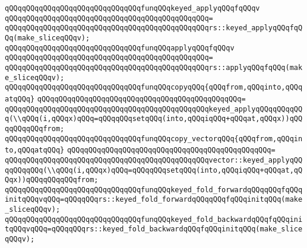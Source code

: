 \newline
\newline
\verb|qQQqqQQqqQQqqQQqqQQqqQQqqQQqqQQqfunqQQqkeyed_applyqQQqfqQQqv|\newline
\verb|qQQqqQQqqQQqqQQqqQQqqQQqqQQqqQQqqQQqqQQqqQQqqQQq=|\newline
\verb|qQQqqQQqqQQqqQQqqQQqqQQqqQQqqQQqqQQqqQQqqQQqqQQqrs::keyed_applyqQQqfqQQq(make_sliceqQQqv);|\newline
\newline
\newline
\verb|qQQqqQQqqQQqqQQqqQQqqQQqqQQqqQQqfunqQQqapplyqQQqfqQQqv|\newline
\verb|qQQqqQQqqQQqqQQqqQQqqQQqqQQqqQQqqQQqqQQqqQQqqQQq=|\newline
\verb|qQQqqQQqqQQqqQQqqQQqqQQqqQQqqQQqqQQqqQQqqQQqqQQqrs::applyqQQqfqQQq(make_sliceqQQqv);|\newline
\newline
\newline
\verb|qQQqqQQqqQQqqQQqqQQqqQQqqQQqqQQqfunqQQqcopyqQQq{qQQqfrom,qQQqinto,qQQqatqQQq}|\newline
\verb|qQQqqQQqqQQqqQQqqQQqqQQqqQQqqQQqqQQqqQQqqQQqqQQq=|\newline
\verb|qQQqqQQqqQQqqQQqqQQqqQQqqQQqqQQqqQQqqQQqqQQqqQQqkeyed_applyqQQqqQQqqQQq(\\qQQq(i,qQQqx)qQQq=qQQqqQQqsetqQQq(into,qQQqiqQQq+qQQqat,qQQqx))qQQqqQQqqQQqfrom;|\newline
\newline
\newline
\verb|qQQqqQQqqQQqqQQqqQQqqQQqqQQqqQQqfunqQQqcopy_vectorqQQq{qQQqfrom,qQQqinto,qQQqatqQQq}|\newline
\verb|qQQqqQQqqQQqqQQqqQQqqQQqqQQqqQQqqQQqqQQqqQQqqQQq=|\newline
\verb|qQQqqQQqqQQqqQQqqQQqqQQqqQQqqQQqqQQqqQQqqQQqqQQqvector::keyed_applyqQQqqQQqqQQq(\\qQQq(i,qQQqx)qQQq=qQQqqQQqsetqQQq(into,qQQqiqQQq+qQQqat,qQQqx))qQQqqQQqqQQqfrom;|\newline
\newline
\verb|qQQqqQQqqQQqqQQqqQQqqQQqqQQqqQQqfunqQQqkeyed_fold_forwardqQQqqQQqfqQQqinitqQQqvqQQq=qQQqqQQqrs::keyed_fold_forwardqQQqqQQqfqQQqinitqQQq(make_sliceqQQqv);|\newline
\verb|qQQqqQQqqQQqqQQqqQQqqQQqqQQqqQQqfunqQQqkeyed_fold_backwardqQQqfqQQqinitqQQqvqQQq=qQQqqQQqrs::keyed_fold_backwardqQQqfqQQqinitqQQq(make_sliceqQQqv);|\newline
\newline
